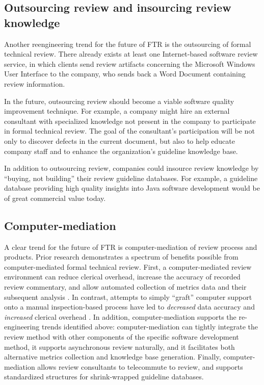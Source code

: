 \subsection*{Outsourcing review and insourcing review knowledge}

Another reengineering trend for the future of FTR is the outsourcing of
formal technical review.  There already exists at least one Internet-based
software review service, in which clients send review artifacts concerning
the Microsoft Windows User Interface to the company, who sends back a Word
Document containing review information.

In the future, outsourcing review should become a viable software quality
improvement technique.  For example, a company might hire an external
consultant with specialized knowledge not present in the company to
participate in formal technical review.  The goal of the consultant's
participation will be not only to discover defects in the current document,
but also to help educate company staff and to enhance the organization's
guideline knowledge base.

In addition to outsourcing review, companies could insource
review knowledge by ``buying, not building'' their review guideline databases.
For example, a guideline database providing high quality insights into Java
software development would be of great commercial value today.

\subsection*{Computer-mediation}

A clear trend for the future of FTR is computer-mediation of review process
and products.  Prior research demonstrates a spectrum of benefits possible
from computer-mediated formal technical review. First, a
computer-mediated review environment can reduce clerical overhead, increase the
accuracy of recorded review commentary, and allow automated collection of
metrics data and their subsequent analysis \cite{Johnson94}.  In contrast,
attempts to simply ``graft'' computer support onto a manual
inspection-based process have led to {\em decreased} data accuracy and {\em
  increased} clerical overhead \cite{Weller93}.  In addition,
computer-mediation supports the re-engineering trends identified above:
computer-mediation can tightly integrate the review method with other
components of the specific software development method, it supports
asynchronous review naturally, and it facilitates both alternative metrics
collection and knowledge base generation. Finally, computer-mediation
allows review consultants to telecommute to review, and supports
standardized structures for shrink-wrapped guideline databases.

